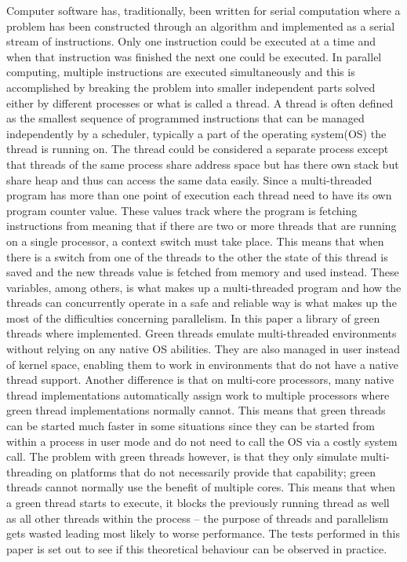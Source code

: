 \documentclass{article}
\begin{document}
Computer software has, traditionally, been written for serial computation where a problem has been constructed through an algorithm and implemented as a serial stream of instructions. Only one instruction could be executed at a time and when that instruction was finished the next one could be executed. In parallel computing, multiple instructions are executed simultaneously and this is accomplished by breaking the problem into smaller independent parts solved either by different processes or what is called a thread.
A thread is often defined as the smallest sequence of programmed instructions that can be managed independently by a scheduler, typically a part of the operating system(OS) the thread is running on. The thread could be considered a separate process except that threads of the same process share address space but has there own stack but share heap and thus can access the same data easily. Since a multi-threaded program has more than one point of execution each thread need to have its own program counter value. These values track where the program is fetching instructions from meaning that if there are two or more threads that are running on a single processor, a context switch must take place. This means that when there is a switch from one of the threads to the other the state of this thread is saved and the new threads value is fetched from memory and used instead. These variables, among others, is what makes up a multi-threaded program and how the threads can concurrently operate in a safe and reliable way is what makes up the most of the difficulties concerning parallelism.  
In this paper a library of green threads where implemented. Green threads emulate multi-threaded environments without relying on any native OS abilities. They are also managed in user instead of kernel space, enabling them to work in environments that do not have a native thread support. Another difference is that on multi-core processors, many native thread implementations automatically assign work to multiple processors where green thread implementations normally cannot. This means that green threads can be started much faster in some situations since they can be started from within a process in user mode and do not need to call the OS via a costly system call. The problem with green threads however, is that they only simulate multi-threading on platforms that do not necessarily provide that capability; green threads cannot normally use the benefit of multiple cores. This means that when a green thread starts to execute, it blocks the previously running thread  as well as all other threads within the process – the purpose of threads and parallelism gets wasted leading most likely to worse performance. The tests performed in this paper is set out to see if this theoretical behaviour can be observed in practice.
\end{document}
